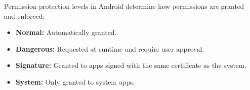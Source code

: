\documentclass[11pt]{article}
\begin{document}
\begin{enumerate}
          Permission protection levels in Android determine how permissions are granted and enforced:

          \begin{itemize}
              \item \textbf{Normal:} Automatically granted.
              \item \textbf{Dangerous:} Requested at runtime and require user approval.
              \item \textbf{Signature:} Granted to apps signed with the same certificate as the system.
              \item \textbf{System:} Only granted to system apps.
          \end{itemize}

\end{enumerate}
\end{document}
